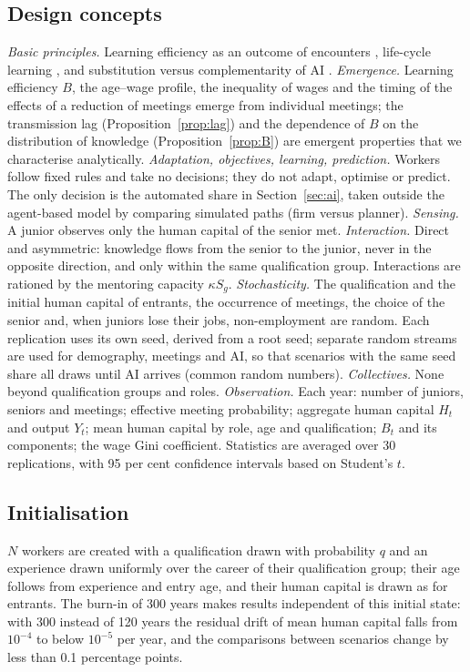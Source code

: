 \documentclass[preprint,12pt,authoryear]{elsarticle}
\begin{document}
\subsection{Design concepts}
\emph{Basic principles.} Learning efficiency as an outcome of encounters \citep{LucasMoll2014}, life-cycle learning \citep{BenPorath1967}, and substitution versus complementarity of AI \citep{Acemoglu2024,Ide2026}.
\emph{Emergence.} Learning efficiency $B$, the age--wage profile, the inequality of wages and the timing of the effects of a reduction of meetings emerge from individual meetings; the transmission lag (Proposition~\ref{prop:lag}) and the dependence of $B$ on the distribution of knowledge (Proposition~\ref{prop:B}) are emergent properties that we characterise analytically.
\emph{Adaptation, objectives, learning, prediction.} Workers follow fixed rules and take no decisions; they do not adapt, optimise or predict. The only decision is the automated share in Section~\ref{sec:ai}, taken outside the agent-based model by comparing simulated paths (firm versus planner).
\emph{Sensing.} A junior observes only the human capital of the senior met.
\emph{Interaction.} Direct and asymmetric: knowledge flows from the senior to the junior, never in the opposite direction, and only within the same qualification group. Interactions are rationed by the mentoring capacity $\kappa S_g$.
\emph{Stochasticity.} The qualification and the initial human capital of entrants, the occurrence of meetings, the choice of the senior and, when juniors lose their jobs, non-employment are random. Each replication uses its own seed, derived from a root seed; separate random streams are used for demography, meetings and AI, so that scenarios with the same seed share all draws until AI arrives (common random numbers).
\emph{Collectives.} None beyond qualification groups and roles.
\emph{Observation.} Each year: number of juniors, seniors and meetings; effective meeting probability; aggregate human capital $H_t$ and output $Y_t$; mean human capital by role, age and qualification; $B_t$ and its components; the wage Gini coefficient. Statistics are averaged over 30 replications, with 95 per cent confidence intervals based on Student's $t$.

\subsection{Initialisation}
$N$ workers are created with a qualification drawn with probability $q$ and an experience drawn uniformly over the career of their qualification group; their age follows from experience and entry age, and their human capital is drawn as for entrants. The burn-in of 300 years makes results independent of this initial state: with 300 instead of 120 years the residual drift of mean human capital falls from $10^{-4}$ to below $10^{-5}$ per year, and the comparisons between scenarios change by less than 0.1 percentage points.
\end{document}
